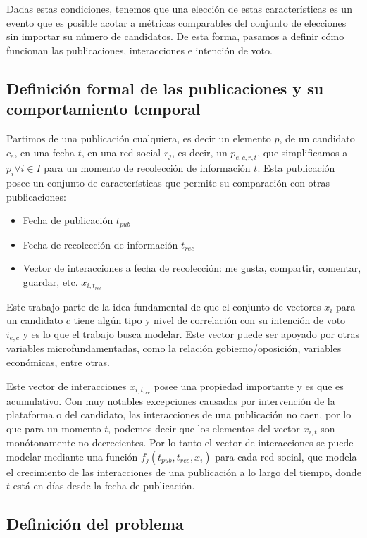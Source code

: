 Dadas estas condiciones, tenemos que una elección de estas características es un evento que es posible acotar a métricas comparables del conjunto de elecciones sin importar su número de candidatos. De esta forma, pasamos a definir cómo funcionan las publicaciones, interacciones e intención de voto. 

\subsection{Definición formal de las publicaciones y su comportamiento temporal}

Partimos de una publicación cualquiera, es decir un elemento $p$, de un candidato $c_e$, en una fecha $t$, en una red social $r_j$, es decir, un $p_{e,c,r,t}$, que simplificamos a $p_{i} \forall i \in I$ para un momento de recolección de información $t$. Esta publicación posee un conjunto de características que permite su comparación con otras publicaciones:

\begin{itemize}
    \item Fecha de publicación $t_{pub}$
    \item Fecha de recolección de información $t_{rec}$
    \item Vector de interacciones a fecha de recolección: me gusta, compartir, comentar, guardar, etc. ${x}_{i,t_{rec}}$
\end{itemize}

Este trabajo parte de la idea fundamental de que el conjunto de vectores $x_i$ para un candidato $c$ tiene algún tipo y nivel de correlación con su intención de voto ${i}_{e,c}$ y es lo que el trabajo busca modelar. Este vector puede ser apoyado por otras variables microfundamentadas, como la relación gobierno/oposición, variables económicas, entre otras. 

Este vector de interacciones ${x}_{i,t_{rec}}$ posee una propiedad importante y es que es acumulativo. Con muy notables excepciones causadas por intervención de la plataforma o del candidato, las interacciones de una publicación no caen, por lo que para un momento $t$, podemos decir que los elementos del vector ${x}_{i,t}$ son monótonamente no decrecientes. Por lo tanto el vector de interacciones se puede modelar mediante una función ${f}_{j}(t_{pub},t_{rec},x_i)$ para cada red social, que modela el crecimiento de las interacciones de una publicación a lo largo del tiempo, donde $t$ está en días desde la fecha de publicación. 

\subsection{Definición del problema}

